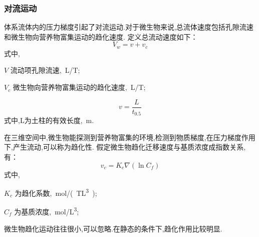 \subsubsection{对流运动}
体系流体内的压力梯度引起了对流运动.对于微生物来说,总流体速度包括孔隙流速和微生物向营养物富集运动的趋化速度.
定义总流动速度如下：
\begin{equation}
V_w=v+v_c
\end{equation}
式中,
\begin{paralist}
	\item[$V$]流动项孔隙流速,\SI{}{L/T};
	\item[$V_c$]微生物向营养物富集运动的趋化速度,\SI{}{L/T};
\end{paralist}
\begin{equation}
v=\dfrac{L}{t_{0.5}}
\end{equation}                        
式中,L为土柱的有效长度,\SI{}{m}.\par
在三维空间中,微生物能探测到营养物富集的环境,检测到物质梯度,在压力梯度作用下,产生流动,可以称为趋化性.
假定微生物趋化迁移速度与基质浓度成指数关系,有：
\begin{equation}
v_c=K_c\nabla(\ln C_f)
\end{equation}
式中,
\begin{paralist}
	\item[$K_c$]为趋化系数,\SI{}{mol/(TL^3)};
	\item[$C_f$]为基质浓度,\SI{}{mol/L^3};
\end{paralist}
微生物趋化运动往往很小,可以忽略.在静态的条件下,趋化作用比较明显.
